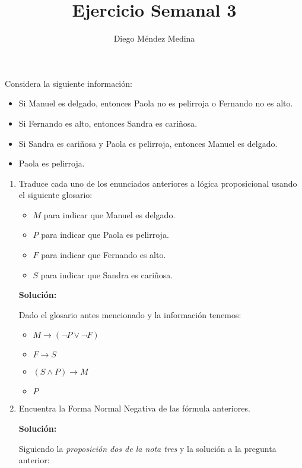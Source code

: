 \documentclass[8pt, letterpaper]{article}
\title{%
  Ejercicio Semanal 3\\
  {\large{}}}
\author{Diego Méndez Medina}
\date{}
\begin{document}
\ttfamily
\maketitle
\rmfamily
Considera la siguiente información:

\begin{itemize}
\item Si Manuel es delgado, entonces Paola no es pelirroja o Fernando no es alto.
\item Si Fernando es alto, entonces Sandra es cariñosa.
\item Si Sandra es cariñosa y Paola es pelirroja, entonces Manuel es delgado.
\item Paola es pelirroja.
\end{itemize}

\begin{enumerate}
\item Traduce cada uno de los enunciados anteriores a lógica proposicional usando el siguiente glosario:
  \begin{itemize}
  \item $M$ para indicar que Manuel es delgado.
  \item $P$ para indicar que Paola es pelirroja.
  \item $F$ para indicar que Fernando es alto.
  \item $S$ para indicar que Sandra es cariñosa.
  \end{itemize}

  \hfill\break
  \ttfamily
  {\bf Solución:}
      
  Dado el glosario antes mencionado y la información tenemos:
  \begin{itemize}
  \item $M\rightarrow (\neg P \lor \neg F)$
  \item $F\rightarrow S$
  \item $(S\land P) \rightarrow M$
  \item $P$
  \end{itemize}
  \rmfamily
\item Encuentra la Forma Normal Negativa de las fórmula anteriores.
  
  \hfill\break
  \ttfamily
  {\bf Solución:}
      
  Siguiendo la \textit{proposición dos de la nota tres} y la solución a la
  pregunta anterior:
  

\end{enumerate}
\end{document}
